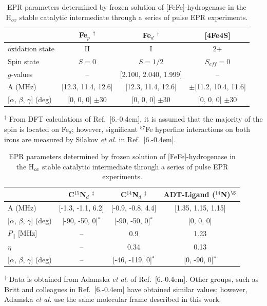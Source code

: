 \begin{table}[htbp]
\caption[EPR parameters determined for FeFe-hydrogenase in Hox state.]{EPR parameters determined by frozen solution of [FeFe]-hydrogenase in the H$_{ox}$ stable catalytic intermediate through a series of pulse EPR experiments.}
\centering
\begin{tabular}{l|c|c||c}
 & Fe$_p$ $^\dagger$ & Fe$_d$ $^\dagger$ & {[}4Fe4S{]} \\ \hline \hline
oxidation state & II & I & 2+ \\
Spin state & $S=0$ & $S=1/2$ & $S_{eff}=0$ \\
$g$-values & -- & {[}2.100, 2.040, 1.999{]} & -- \\
A (MHz) & {[}12.3, 11.4, 12.6{]} & {[}12.3, 11.4, 12.6{]} & $\pm${[}11.2, 10.4, 11.6{]} \\
{[}$\alpha$, $\beta$, $\gamma${]} (deg) & {[}0, 0, 0{]} $\pm$30 & {[}0, 0, 0{]} $\pm$30 & {[}0, 0, 0{]} $\pm$30
\end{tabular}
\begin{flushleft}\footnotesize{$^\dagger$ From DFT calculations of Ref.~[6.\kern-0.4em], it is assumed that the majority of the spin is located on Fe$_d$; however, significant $^{57}$Fe hyperfine interactions on both irons are measured by Silakov \textit{et al.} in Ref.~[6.\kern-0.4em].} \end{flushleft}

\begin{tabular}{l|c|c|c}
& C$^{15}$N$_d$ $^\ddagger$ & C$^{14}$N$_d$ $^\ddagger$ & ADT-Ligand ($^{14}$N)$^{\S}$\\ \hline \hline
A (MHz) &  {[}-1.3, -1.1, 6.2{]} & {[}-0.9, -0.8, 4.4{]} & {[}1.35, 1.15, 1.15{]}\\
{[}$\alpha$, $\beta$, $\gamma${]} (deg) & {[}-90, -50, 0{]}$^\ast$ & {[}-90, -50, 0{]}$^\ast$ & {[}0, 0, 0{]}\\
$P_{||}$ {[}MHz{]} &  -- & 0.9 & 1.23\\ 
$\eta$ & -- & 0.34 & 0.13 \\
{[}$\alpha$, $\beta$, $\gamma${]} (deg) & -- & {[}-46, -119, 0{]}$^\ast$ & {[}0, -90, 0{]}$^\ast$
\end{tabular}
\begin{flushleft}\footnotesize{$^\ddagger$ Data is obtained from Adamska \textit{et al.} of Ref.~[6.\kern-0.4em]. Other groups, such as Britt and colleagues in Ref.~[6.\kern-0.4em] have obtained similar values; however, Adamska \textit{et al.} use the same molecular frame described in this work. 

}
\end{flushleft}
\end{table}
